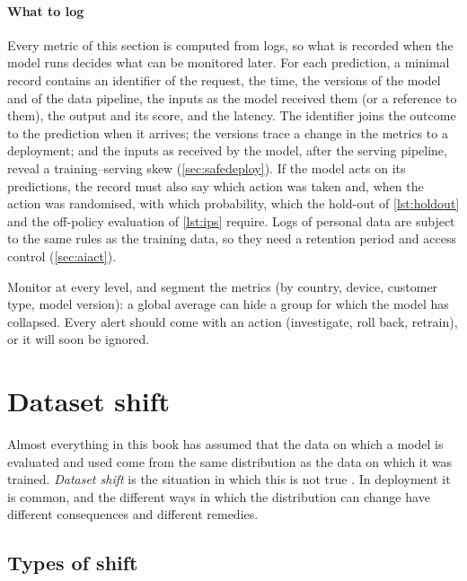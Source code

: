 \paragraph{What to log} Every metric of this section is computed from logs, so what is
recorded when the model runs decides what can be monitored later. For each prediction, a minimal record
contains an identifier of the request, the time, the versions of the model and of the data pipeline, the
inputs as the model received them (or a reference to them), the output and its score, and the latency.
The identifier joins the outcome to the prediction when it arrives; the versions trace a change in the
metrics to a deployment; and the inputs as received by the model, after the serving pipeline, reveal a
training--serving skew (\cref{sec:safedeploy}). If the model acts on its predictions, the record must also
say which action was taken and, when the action was randomised, with which probability, which the hold-out
of \cref{lst:holdout} and the off-policy evaluation of \cref{lst:ips} require. Logs of personal data are
subject to the same rules as the training data, so they need a retention period and access control
(\cref{sec:aiact}).

\begin{keyidea}
Monitor at every level, and segment the metrics (by country, device, customer type, model version): a
global average can hide a group for which the model has collapsed. Every alert should come with an action
(investigate, roll back, retrain), or it will soon be ignored.
\end{keyidea}

\section{Dataset shift}\label{sec:shift}

Almost everything in this book has assumed that the data on which a model is evaluated and used come
from the same distribution as the data on which it was trained. \emph{Dataset shift} is the situation in
which this is not true \citep{quinonero2009dataset,morenotorres2012unifying}. In deployment it is common, and the different ways in which the distribution can change have different
consequences and different remedies.

\subsection{Types of shift}

